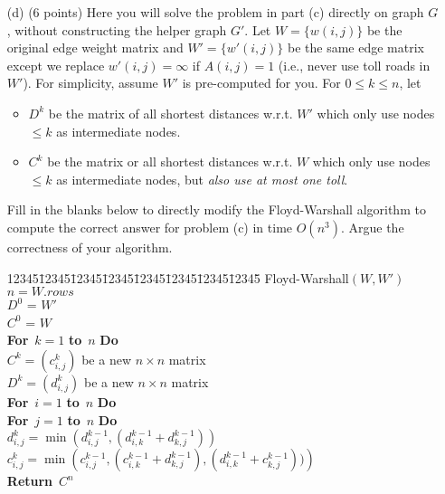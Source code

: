 \documentclass[11pt]{article}
\newenvironment{code}{\begin{tabbing}
12345\=12345\=12345\=12345\=12345\=12345\=12345\=12345\= \kill }
{\end{tabbing}}
\newcommand{\For}{\mbox{\bf For }}
\newcommand{\To}{\mbox{\bf to }}
\newcommand{\Do}{\mbox{\bf Do }}
\newcommand{\Return}{\mbox{\bf Return }}
\begin{document}
\begin{itemize}
\item[(d)] (6 points) Here you will solve the problem in part (c) directly on graph $G$, without constructing the helper graph $G'$. Let $W = \{w(i,j)\}$ be the original edge weight matrix and $W' = \{w'(i,j)\}$ be the same edge
    matrix except we replace $w'(i,j)=\infty$ if $A(i,j)=1$ (i.e., never use toll roads in $W'$). For simplicity, assume $W'$ is pre-computed for you. For $0\le k\le n$, let
 \begin{itemize}
 \item $D^k$ be the matrix of all shortest distances w.r.t. $W'$ which only use nodes $\le k$ as intermediate nodes.
 \item $C^k$ be the matrix or all shortest distances w.r.t. $W$ which only use nodes $\le k$ as intermediate nodes, but {\em also use at most one toll}.
 \end{itemize}
Fill in the blanks below to directly modify the Floyd-Warshall algorithm to compute the correct answer for problem (c) in time $O(n^3)$. Argue the correctness of your algorithm.

\begin{code}
{\sc Floyd-Warshall}$(W,W')$\\
\> $n = W.rows$\\
\> $D^0$ = $W'$\\
\> $C^0$ = $W$\\
\> \For $k = 1$ \To $n$ \Do \\
\> \> $C^k = (c_{i,j}^k)$ be a new $n \times n$ matrix\\
\> \> $D^k = (d_{i,j}^k)$ be a new $n \times n$ matrix\\
\> \> \For $i = 1 $ \To $n$ \Do\\
\> \> \> \For $j = 1$ \To $ n$ \Do \\
\> \> \> \> $d_{i,j}^k = \min \left(d_{i,j}^{k-1},    ( d_{i,k}^{k-1} + d_{k,j}^{k-1} )  \right)$ \\
\> \> \> \> $c_{i,j}^k = \min \left(c_{i,j}^{k-1},  ( c_{i,k}^{k-1} + d_{k,j}^{k-1} ) , (d_{i,k}^{k-1} + c_{k,j}^{k-1}) )  \right)$ \\
\> \Return $ C^n $
\end{code}


\end{itemize}
\end{document}
